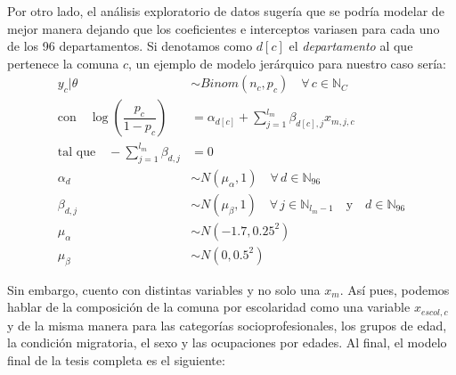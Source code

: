 Por otro lado, el análisis exploratorio de datos sugería que se podría modelar de mejor manera dejando que los coeficientes e interceptos variasen para cada uno de los 96 departamentos. Si denotamos como $d[c]$ el \textit{departamento} al que pertenece la comuna $c$, un ejemplo de modelo jerárquico para nuestro caso sería: 
\begin{align}\label{eq:Modelo_Jer_Ind}
y_c|\theta & \sim Binom(n_c,p_c) \quad \forall \, c \in \mathbb{N}_C \nonumber \\
\text{con} \quad \log\left(\dfrac{p_c}{1-p_c}\right) &= \alpha_{d[c]} + \sum\limits_{j=1}^{l_m} \beta_{d[c],j} x_{m,j,c} \nonumber\\ 
\text{tal que} \quad -\sum\limits_{j = 1}^{l_m} \beta_{d,j} &= 0 \nonumber \\
\alpha_d & \sim N(\mu_{\alpha}, 1) \quad \forall \, d \in \mathbb{N}_{96} \nonumber \\
\beta_{d,j} & \sim N(\mu_{\beta}, 1) \quad \forall \, j \in \mathbb{N}_{l_m-1}  \quad \text{y} \quad d \in \mathbb{N}_{96} \nonumber \\
\mu_{\alpha} &\sim N(-1.7, 0.25^2) \nonumber \\
\mu_{\beta} &\sim N(0,0.5^2)
\end{align}

Sin embargo, cuento con distintas variables y no solo una $x_m$. Así pues, podemos hablar de la composición de la comuna por escolaridad como una variable $x_{escol,c}$ y de la misma manera para las categorías socioprofesionales, los grupos de edad, la condición migratoria, el sexo y las ocupaciones por edades. Al final, el modelo final de la tesis completa es el siguiente: 

